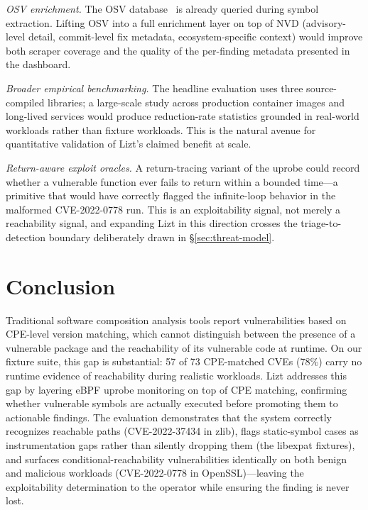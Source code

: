 \documentclass[conference]{IEEEtran}
\begin{document}
\emph{OSV enrichment.} The OSV database~\cite{osv} is already queried during symbol extraction. Lifting OSV into a full enrichment layer on top of NVD (advisory-level detail, commit-level fix metadata, ecosystem-specific context) would improve both scraper coverage and the quality of the per-finding metadata presented in the dashboard.

\emph{Broader empirical benchmarking.} The headline evaluation uses three source-compiled libraries; a large-scale study across production container images and long-lived services would produce reduction-rate statistics grounded in real-world workloads rather than fixture workloads. This is the natural avenue for quantitative validation of Lizt's claimed benefit at scale.

\emph{Return-aware exploit oracles.} A return-tracing variant of the uprobe could record whether a vulnerable function ever fails to return within a bounded time---a primitive that would have correctly flagged the infinite-loop behavior in the malformed CVE-2022-0778 run. This is an exploitability signal, not merely a reachability signal, and expanding Lizt in this direction crosses the triage-to-detection boundary deliberately drawn in \S\ref{sec:threat-model}.


\section{Conclusion}

Traditional software composition analysis tools report vulnerabilities based on CPE-level version matching, which cannot distinguish between the presence of a vulnerable package and the reachability of its vulnerable code at runtime. On our fixture suite, this gap is substantial: 57 of 73 CPE-matched CVEs (78\%) carry no runtime evidence of reachability during realistic workloads. Lizt addresses this gap by layering eBPF uprobe monitoring on top of CPE matching, confirming whether vulnerable symbols are actually executed before promoting them to actionable findings. The evaluation demonstrates that the system correctly recognizes reachable paths (CVE-2022-37434 in zlib), flags static-symbol cases as instrumentation gaps rather than silently dropping them (the libexpat fixtures), and surfaces conditional-reachability vulnerabilities identically on both benign and malicious workloads (CVE-2022-0778 in OpenSSL)---leaving the exploitability determination to the operator while ensuring the finding is never lost.
\end{document}
